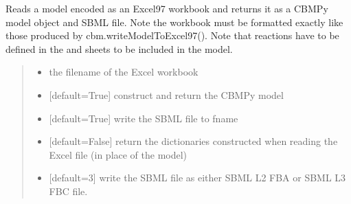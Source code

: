 \documentclass[letterpaper,12pt,english]{sphinxmanual}
\begin{document}
\begin{fulllineitems}

\pysigstartsignatures
\pysiglinewithargsret
{}
{\sphinxparamcomma {}\sphinxparamcomma {}\sphinxparamcomma {}}
{}
\pysigstopsignatures
\sphinxAtStartPar
Reads a model encoded as an Excel97 workbook and returns it as a CBMPy model object and SBML file. Note the workbook must be formatted exactly like those produced by cbm.writeModelToExcel97(). Note that reactions have to be defined in  the  and  sheets to be included in the model.
\begin{quote}\begin{description}
\begin{itemize}
\item {} 
\sphinxAtStartPar
{} \textendash{} the filename of the Excel workbook

\item {} 
\sphinxAtStartPar
{} \textendash{} {[}default=True{]} construct and return the CBMPy model

\item {} 
\sphinxAtStartPar
{} \textendash{} {[}default=True{]} write the SBML file to fname

\item {} 
\sphinxAtStartPar
{} \textendash{} {[}default=False{]} return the dictionaries constructed when reading the Excel file (in place of the model)

\item {} 
\sphinxAtStartPar
{} \textendash{} {[}default=3{]} write the SBML file as either SBML L2 FBA or SBML L3 FBC file.

\end{itemize}

\end{description}\end{quote}

\end{fulllineitems}
\end{document}
